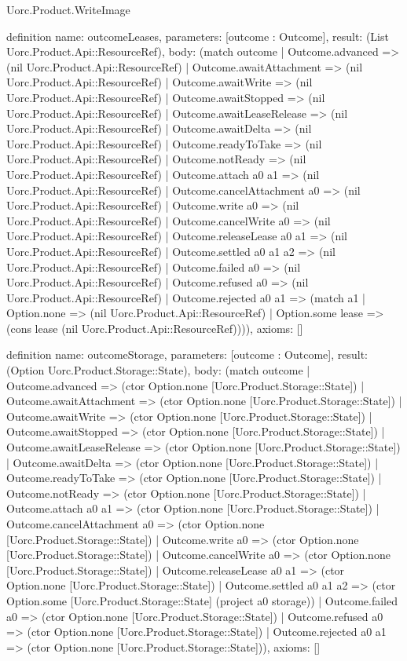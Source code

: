 \begin{lexlean}{Uorc.Product.WriteImage}
\begin{semanticmodule}
definition{
  name: outcomeLeases,
  parameters: [outcome : Outcome],
  result: (List Uorc.Product.Api::ResourceRef),
  body: (match outcome
    | Outcome.advanced => (nil Uorc.Product.Api::ResourceRef)
    | Outcome.awaitAttachment => (nil Uorc.Product.Api::ResourceRef)
    | Outcome.awaitWrite => (nil Uorc.Product.Api::ResourceRef)
    | Outcome.awaitStopped => (nil Uorc.Product.Api::ResourceRef)
    | Outcome.awaitLeaseRelease => (nil Uorc.Product.Api::ResourceRef)
    | Outcome.awaitDelta => (nil Uorc.Product.Api::ResourceRef)
    | Outcome.readyToTake => (nil Uorc.Product.Api::ResourceRef)
    | Outcome.notReady => (nil Uorc.Product.Api::ResourceRef)
    | Outcome.attach a0 a1 => (nil Uorc.Product.Api::ResourceRef)
    | Outcome.cancelAttachment a0 => (nil Uorc.Product.Api::ResourceRef)
    | Outcome.write a0 => (nil Uorc.Product.Api::ResourceRef)
    | Outcome.cancelWrite a0 => (nil Uorc.Product.Api::ResourceRef)
    | Outcome.releaseLease a0 a1 => (nil Uorc.Product.Api::ResourceRef)
    | Outcome.settled a0 a1 a2 => (nil Uorc.Product.Api::ResourceRef)
    | Outcome.failed a0 => (nil Uorc.Product.Api::ResourceRef)
    | Outcome.refused a0 => (nil Uorc.Product.Api::ResourceRef)
    | Outcome.rejected a0 a1 => (match a1
      | Option.none => (nil Uorc.Product.Api::ResourceRef)
      | Option.some lease => (cons lease (nil Uorc.Product.Api::ResourceRef)))),
  axioms: []
}

definition{
  name: outcomeStorage,
  parameters: [outcome : Outcome],
  result: (Option Uorc.Product.Storage::State),
  body: (match outcome
    | Outcome.advanced => (ctor Option.none [Uorc.Product.Storage::State])
    | Outcome.awaitAttachment => (ctor Option.none [Uorc.Product.Storage::State])
    | Outcome.awaitWrite => (ctor Option.none [Uorc.Product.Storage::State])
    | Outcome.awaitStopped => (ctor Option.none [Uorc.Product.Storage::State])
    | Outcome.awaitLeaseRelease => (ctor Option.none [Uorc.Product.Storage::State])
    | Outcome.awaitDelta => (ctor Option.none [Uorc.Product.Storage::State])
    | Outcome.readyToTake => (ctor Option.none [Uorc.Product.Storage::State])
    | Outcome.notReady => (ctor Option.none [Uorc.Product.Storage::State])
    | Outcome.attach a0 a1 => (ctor Option.none [Uorc.Product.Storage::State])
    | Outcome.cancelAttachment a0 => (ctor Option.none [Uorc.Product.Storage::State])
    | Outcome.write a0 => (ctor Option.none [Uorc.Product.Storage::State])
    | Outcome.cancelWrite a0 => (ctor Option.none [Uorc.Product.Storage::State])
    | Outcome.releaseLease a0 a1 => (ctor Option.none [Uorc.Product.Storage::State])
    | Outcome.settled a0 a1 a2 => (ctor Option.some [Uorc.Product.Storage::State] (project a0 storage))
    | Outcome.failed a0 => (ctor Option.none [Uorc.Product.Storage::State])
    | Outcome.refused a0 => (ctor Option.none [Uorc.Product.Storage::State])
    | Outcome.rejected a0 a1 => (ctor Option.none [Uorc.Product.Storage::State])),
  axioms: []
}


\end{semanticmodule}
\end{lexlean}
